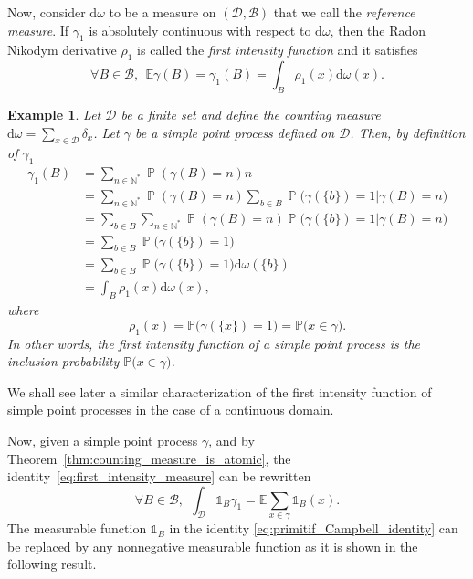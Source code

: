 \documentclass[twoside,11pt]{book}
\newtheorem{example}{Example}
\numberwithin{theorem}{chapter}
\numberwithin{definition}{chapter}
\numberwithin{proposition}{chapter}
\numberwithin{corollary}{chapter}
\numberwithin{example}{chapter}
\numberwithin{lemma}{chapter}
\numberwithin{assumption}{chapter}
\numberwithin{equation}{chapter}
\numberwithin{figure}{chapter}
\DeclareMathOperator{\Prb}{\mathbb{P}}
\begin{document}
Now, consider $\mathrm{d}\omega$ to be a measure on $(\mathcal{D},\mathcal{B})$ that we call the \emph{reference measure}. If $\gamma_{1}$ is absolutely continuous with respect to $\mathrm{d}\omega$, then the Radon Nikodym derivative $\rho_{1}$ is called the \emph{first intensity function} and it satisfies
\begin{equation}\label{eq:first_intensity_function}
\forall B \in \mathcal{B}, \:\:\mathbb{E} \gamma(B) = \gamma_1(B) = \int_{B} \rho_{1}(x) \mathrm{d}\omega(x). 
\end{equation}

\begin{example}\label{ex:rho_1_inclustion_probability_discret_set}
Let $\mathcal{D}$ be a finite set and define the counting measure $\mathrm{d}\omega = \sum\limits_{x \in \mathcal{D}} \delta_x$. Let $\gamma$ be a simple point process defined on $\mathcal{D}$. Then, by definition of $\gamma_{1}$
\begin{align}
\gamma_1(B) & = \sum\limits_{n \in \mathbb{N}^{*}} \Prb(\gamma(B) = n) n\\
& = \sum\limits_{n \in \mathbb{N}^{*}} \Prb(\gamma(B) = n) \sum\limits_{b \in B} \Prb \big( \gamma(\{b\}) = 1| \gamma(B) = n \big) \nonumber\\
& = \sum\limits_{b \in B} \sum\limits_{n \in \mathbb{N}^{*}} \Prb(\gamma(B) = n)  \Prb \big( \gamma(\{b\}) = 1| \gamma(B) = n \big) \nonumber\\
& = \sum\limits_{b \in B}  \Prb \big( \gamma(\{b\}) = 1\big) \nonumber\\
& = \sum\limits_{b \in B}  \Prb \big( \gamma(\{b\}) = 1\big) \mathrm{d}\omega(\{b\}) \nonumber\\
& = \int_{B} \rho_{1}(x) \mathrm{d}\omega(x), \nonumber
\end{align}
where 
\begin{equation}
\rho_{1}(x) = \mathbb{P} \big(\gamma(\{x\}) = 1 \big) = \mathbb{P} \big( x \in \gamma \big) .
\end{equation}
In other words, the first intensity function of a simple point process is the inclusion probability $\mathbb{P} \big(x \in \gamma \big)$.
\end{example}
We shall see later a similar characterization of the first intensity function of simple point processes in the case of a continuous domain.

Now, given a simple point process $\gamma$, and by Theorem~\ref{thm:counting_measure_is_atomic}, the identity~\eqref{eq:first_intensity_measure} can be rewritten
\begin{equation}\label{eq:primitif_Campbell_identity}
\forall B \in \mathcal{B}, \:\:\int_{\mathcal{D}} \mathbb{1}_{B} \gamma_1 = \mathbb{E}\sum\limits_{x \in \gamma} \mathbb{1}_{B}(x).
\end{equation}
The measurable function $\mathbb{1}_{B}$ in the identity \eqref{eq:primitif_Campbell_identity} can be replaced by any nonnegative measurable function as it is shown in the following result.
\end{document}
